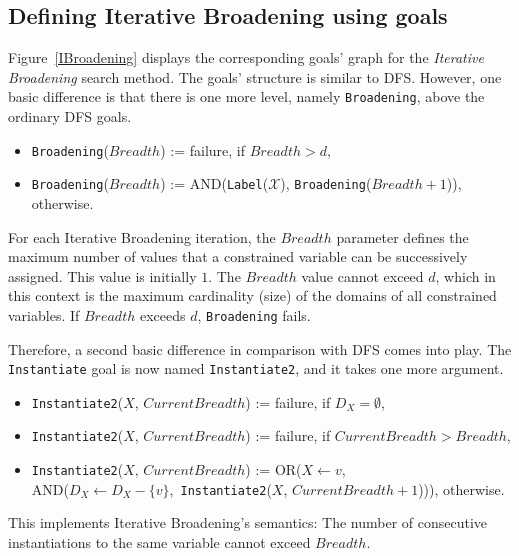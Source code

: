 \documentclass{ws-ijait}
\begin{document}
\subsection{Defining Iterative Broadening using goals}

Figure~\ref{IBroadening} displays the corresponding goals'
graph for the \emph{Iterative Broadening} search
method.\cite{Ginsberg1992} The goals' structure is similar
to DFS. However, one basic difference is that there is one
more level, namely \texttt{Broadening}, above the ordinary
DFS goals.
\begin{itemize}
  \item \texttt{Broadening}($\mathit{Breadth}$) :=
          \textsf{failure}, if $\mathit{Breadth} > d$,
  \item \texttt{Broadening}($\mathit{Breadth}$) :=
          \textsf{AND}(\texttt{Label}($\mathscr{X}$),
            \texttt{Broadening}($\mathit{Breadth} + 1$)),
        otherwise.
\end{itemize}
For each Iterative Broadening iteration, the
$\mathit{Breadth}$ parameter defines the maximum number of
values that a constrained variable can be successively
assigned. This value is initially $1$. The
$\mathit{Breadth}$ value cannot exceed $d$, which in this
context is the maximum cardinality (size) of the domains of
all constrained variables. If $\mathit{Breadth}$ exceeds
$d$, \texttt{Broadening} fails.

Therefore, a second basic difference in comparison with DFS
comes into play. The \texttt{Instantiate} goal is now named
\texttt{Instantiate2}, and it takes one more argument.
\begin{itemize}
  \item \texttt{Instantiate2}($X$,
                              $\mathit{CurrentBreadth}$) :=
          \textsf{failure},
          if $D_X = \emptyset$,
  \item \texttt{Instantiate2}($X$,
                              $\mathit{CurrentBreadth}$) :=
          \textsf{failure},
          if $\mathit{CurrentBreadth} > \mathit{Breadth}$,
  \item \texttt{Instantiate2}($X$,
                              $\mathit{CurrentBreadth}$) :=
          \textsf{OR}($X \! \gets \! v$, \\
            \textsf{AND}($D_X \!\! \gets \!\!
                D_X \!\! - \!\! \{v\}$,\,
              \texttt{Instantiate2}($X$,
                $\mathit{CurrentBreadth} + 1$))), otherwise.
\end{itemize}
This implements Iterative Broadening's semantics: The number
of consecutive instantiations to the same variable cannot
exceed $\mathit{Breadth}$.
\end{document}
